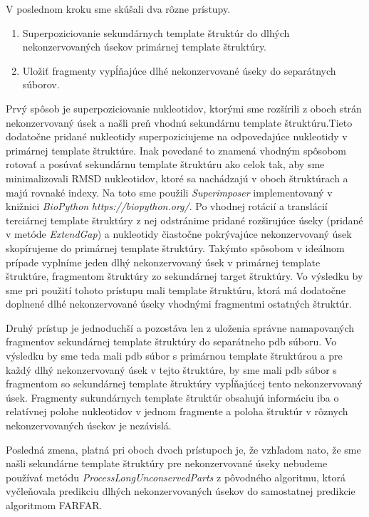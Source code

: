 \indent V poslednom kroku sme skúšali dva rôzne prístupy. 
\begin{enumerate}
\item Superpoziciovanie sekundárnych template štruktúr do dlhých nekonzervovaných úsekov primárnej template štruktúry.
\item Uložiť fragmenty vypĺňajúce dlhé nekonzervované úseky do separátnych súborov.
\end{enumerate}

\indent Prvý spôsob je superpoziciovanie nukleotidov, ktorými sme rozšírili z oboch strán nekonzervovaný úsek a našli preň vhodnú sekundárnu template štruktúru.Tieto dodatočne pridané nukleotidy superpoziciujeme na odpovedajúce nukleotidy v primárnej template štruktúre. Inak povedané to znamená vhodným spôsobom rotovať a posúvať sekundárnu template štruktúru ako celok tak, aby sme minimalizovali RMSD nukleotidov, ktoré sa nachádzajú v oboch štruktúrach a majú rovnaké indexy. Na toto sme použili \textit{Superimposer} implementovaný v knižnici \textit{BioPython} \textit{https://biopython.org/}. Po vhodnej rotácií a translácií terciárnej template štruktúry z nej odstránime pridané rozširujúce úseky (pridané v metóde \textit{ExtendGap}) a nukleotidy čiastočne pokrývajúce nekonzervovaný úsek skopírujeme do primárnej template štruktúry. Takýmto spôsobom v ideálnom prípade vyplníme jeden dlhý nekonzervovaný úsek v primárnej template štruktúre, fragmentom štruktúry zo sekundárnej target štruktúry. Vo výsledku by sme pri použití tohoto prístupu mali template štruktúru, ktorá má dodatočne doplnené dlhé nekonzervované úseky vhodnými fragmentmi ostatných štruktúr. 


\indent Druhý prístup je jednoduchší a pozostáva len z uloženia správne namapovaných fragmentov sekundárnej template štruktúry do separátneho pdb súboru. Vo výsledku by sme teda mali pdb súbor s primárnou template štruktúrou a pre každý dlhý nekonzervovaný úsek v tejto štruktúre, by sme mali pdb súbor s fragmentom so sekundárnej template štruktúry vypĺňajúcej tento nekonzervovaný úsek. Fragmenty sukundárnych template štruktúr obsahujú informáciu iba o  relatívnej polohe nukleotidov v jednom fragmente a poloha štruktúr v rôznych nekonzervovaných úsekov je nezávislá.


\indent Posledná zmena, platná pri oboch dvoch prístupoch je, že vzhľadom nato, že sme našli sekundárne template štruktúry pre nekonzervované úseky nebudeme používať metódu \textit{ProcessLongUnconservedParts} z pôvodného algoritmu, ktorá vyčleňovala predikciu dlhých nekonzervovaných úsekov do samostatnej predikcie algoritmom FARFAR.


